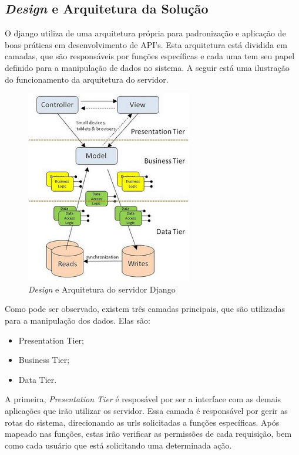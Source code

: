 \subsection{\textit{Design} e Arquitetura da Solução}
\label{sub:design_e_arquitetura_da_soluca_o}

O django utiliza de uma arquitetura própria para padronização e aplicação de boas
práticas em desenvolvimento de API's. Esta arquitetura está dividida em camadas,
que são responsáveis por funções específicas e cada uma tem seu papel definido
para a manipulação de dados no sistema. A seguir está uma ilustração do funcionamento
da arquitetura do servidor. 

\begin{figure}
    \begin{center}
        \includegraphics[scale=1]{figuras/rest_arch.jpg}
    \end{center}
    \caption{\textit{Design} e Arquitetura do servidor Django}
    \label{fig:rest_arch}
\end{figure}

Como pode ser observado, existem três camadas principais, que são utilizadas
para a manipulação dos dados. Elas são:

\begin{itemize}
    \item Presentation Tier;
    \item Business Tier;
    \item Data Tier.
\end{itemize}

A primeira, \textit{Presentation Tier} é resposável por ser a interface com as demais aplicações
que irão utilizar os servidor. Essa camada é responsável por gerir as rotas do sistema, direcionando
as urls solicitadas a funções específicas. Após mapeado nas funções, estas irão verificar as permissões
de cada requisição, bem como cada usuário que está solicitando uma determinada ação.


